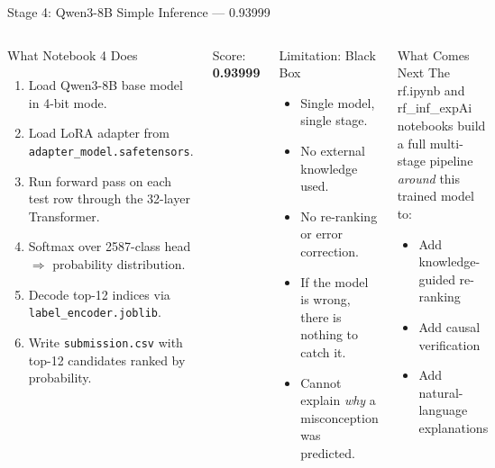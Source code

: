 ﻿\documentclass[aspectratio=169,10pt]{beamer}
\begin{document}
\begin{frame}{Stage 4: Qwen3-8B Simple Inference --- 0.93999}
\begin{columns}[T]
\begin{block}{What Notebook 4 Does}
\begin{enumerate}
  \item Load Qwen3-8B base model in 4-bit mode.
  \item Load LoRA adapter from \texttt{adapter\_model.safetensors}.
  \item Run forward pass on each test row through the 32-layer Transformer.
  \item Softmax over 2587-class head $\Rightarrow$ probability distribution.
  \item Decode top-12 indices via \texttt{label\_encoder.joblib}.
  \item Write \texttt{submission.csv} with top-12 candidates ranked by probability.
\end{enumerate}
\end{block}
\vspace{4pt}
\begin{center}
{\Large\color{GreenOk} Score: \textbf{0.93999}} 
\end{center}
\begin{alertblock}{Limitation: Black Box}
\begin{itemize}
  \item Single model, single stage.
  \item No external knowledge used.
  \item No re-ranking or error correction.
  \item If the model is wrong, there is nothing to catch it.
  \item Cannot explain \textit{why} a misconception was predicted.
\end{itemize}
\end{alertblock}
\vspace{8pt}
\begin{block}{What Comes Next}
The rf.ipynb and rf\_inf\_expAi notebooks build a full multi-stage pipeline \textit{around} this trained model to:
\begin{itemize}
  \item Add knowledge-guided re-ranking
  \item Add causal verification
  \item Add natural-language explanations
\end{itemize}
\end{block}
\end{columns}
\end{frame}
\end{document}
